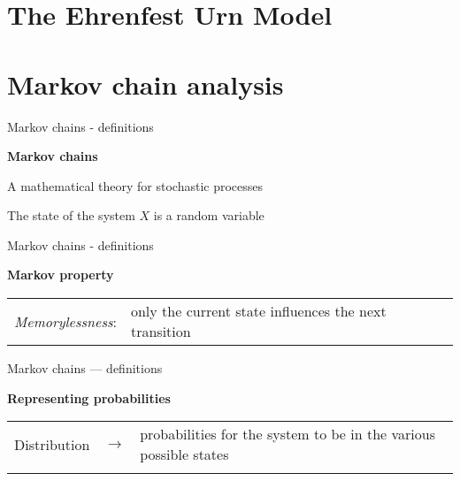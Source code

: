 \documentclass[usenames,dvipsnames]{beamer}
\begin{document}
  \label{model}
  \section{The Ehrenfest Urn Model}
  

  \label{markov}
  \section{Markov chain analysis}
  \begin{frame}{Markov chains - definitions}
    \begin{center}
      \Large{\textbf{Markov chains}}
    \end{center}
    A mathematical theory for stochastic processes

    The state of the system $X$ is a random variable

    \bigskip
    \begin{figure}
      
    \end{figure}
  \end{frame}

  \begin{frame}{Markov chains - definitions}
    \begin{center}
      \Large{\textbf{Markov property}}
    \end{center}
    \begin{table}
      \begin{tabularx}{\textwidth}{c >{\raggedright}X}
        \alert{\emph{Memorylessness}}: & only the current state influences the next transition \tabularnewline
      \end{tabularx}
    \end{table}
  \end{frame}

  \begin{frame}{Markov chains --- definitions}
    \begin{center}
      \Large \textbf{Representing probabilities}
    \end{center}

    \renewcommand{\tabularxcolumn}{m}
    \begin{table}
      \begin{tabularx}{0.9\textwidth}{c c >{\raggedright}X}
        \alert{Distribution} & $\rightarrow$ & probabilities for the system to be in the various possible states \tabularnewline
        & & \tabularnewline
        
      \end{tabularx}

    \end{table}
    
  \end{frame}
\end{document}
